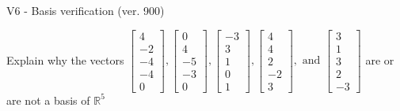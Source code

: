 \begin{exercise}
  \begin{exerciseTitle}V6 - Basis verification (ver. 900)\end{exerciseTitle}
  \begin{exerciseStatement}
    Explain why the vectors \(\left[\begin{array}{r}
4 \\
-2 \\
-4 \\
-4 \\
0
\end{array}\right] , \left[\begin{array}{r}
0 \\
4 \\
-5 \\
-3 \\
0
\end{array}\right] , \left[\begin{array}{r}
-3 \\
3 \\
1 \\
0 \\
1
\end{array}\right] , \left[\begin{array}{r}
4 \\
4 \\
2 \\
-2 \\
3
\end{array}\right] , \text{ and } \left[\begin{array}{r}
3 \\
1 \\
3 \\
2 \\
-3
\end{array}\right]\) are or are not a basis of \(\mathbb{R}^5\)	



\end{exerciseStatement}
\end{exercise}
